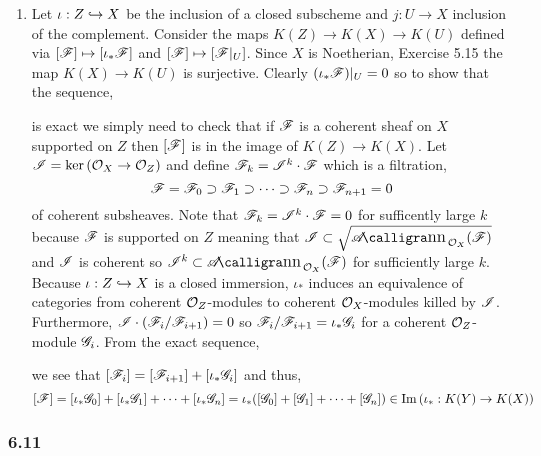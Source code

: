 \documentclass[12pt]{article}
\begin{document}
\begin{enumerate}
\item Let $\iota : Z \hookrightarrow X$ be the inclusion of a closed subscheme and $j : U \to X$ inclusion of the complement. Consider the maps $K(Z) \to K(X) \to K(U)$ defined via $[\mathscr{F}] \mapsto [\iota_* \mathscr{F}]$ and $[\mathscr{F}] \mapsto [\mathscr{F}|_U]$. Since $X$ is Noetherian, Exercise 5.15 the map $K(X) \to K(U)$ is surjective. Clearly $(\iota_* \mathscr{F})|_U = 0$ so to show that the sequence,
\begin{center}
\end{center}
is exact we simply need to check that if $\mathscr{F}$ is a coherent sheaf on $X$ supported on $Z$ then $[\mathscr{F}]$ is in the image of $K(Z) \to K(X)$. Let $\mathscr{I} = \ker{(\mathcal{O}_{X} \to \mathcal{O}_{Z})}$ and define $\mathscr{F}_k = \mathscr{I}^k \cdot \mathscr{F}$ which is a filtration,
\[ \mathscr{F} = \mathscr{F}_0 \supset \mathscr{F}_1 \supset \cdots \supset \mathscr{F}_n \supset \mathscr{F}_{n+1} = 0 \]
of coherent subsheaves. Note that $\mathscr{F}_k = \mathscr{I}^k \cdot \mathscr{F} = 0$ for sufficently large $k$ because $\mathscr{F}$ is supported on $Z$ meaning that $\I \subset \sqrt{\shAnn{\struct{X}}{\F}}$ and $\mathscr{I}$ is coherent so $\I^k \subset \shAnn{\struct{X}}{\F}$ for sufficiently large $k$.
\bigskip\\
Because $\iota : Z \hookrightarrow X$ is a closed immersion, $\iota_*$ induces an equivalence of categories from coherent $\mathcal{O}_{Z}$-modules to coherent $\mathcal{O}_{X}$-modules killed by $\mathscr{I}$. Furthermore, $\mathscr{I} \cdot (\mathscr{F}_i/\mathscr{F}_{i+1}) = 0$ so $\mathscr{F}_i / \mathscr{F}_{i + 1} = \iota_* \mathscr{G}_i$ for a coherent $\mathcal{O}_{Z}$-module $\mathscr{G}_i$. From the exact sequence,
\begin{center}
\end{center}
we see that $[\mathscr{F}_i] = [\mathscr{F}_{i+1}] + [\iota_* \mathscr{G}_i]$ and thus,
\[ [\mathscr{F}] = [\iota_* \mathscr{G}_0] + [\iota_* \mathscr{G}_1] + \cdots + [\iota_* \mathscr{G}_n] = \iota_* ([\mathscr{G}_0] + [\mathscr{G}_1] + \cdots + [\mathscr{G}_n]) \in \mathrm{Im}\left( \iota_* : K(Y) \to K(X) \right) \]
\end{enumerate}

\subsubsection{6.11}
\end{document}
